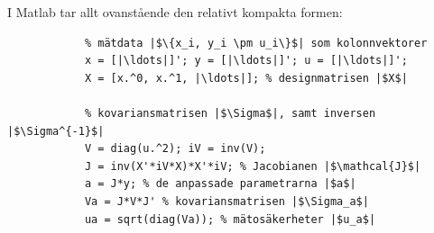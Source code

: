 \documentclass[9pt]{beamer}
\begin{document}
    \begin{frame}[fragile]
        I Matlab tar allt ovanstående den relativt kompakta formen:
        \begin{verbatim}
            % mätdata |$\{x_i, y_i \pm u_i\}$| som kolonnvektorer
            x = [|\ldots|]'; y = [|\ldots|]'; u = [|\ldots|]';
            X = [x.^0, x.^1, |\ldots|]; % designmatrisen |$X$|

            % kovariansmatrisen |$\Sigma$|, samt inversen |$\Sigma^{-1}$|
            V = diag(u.^2); iV = inv(V);
            J = inv(X'*iV*X)*X'*iV; % Jacobianen |$\mathcal{J}$|
            a = J*y; % de anpassade parametrarna |$a$|
            Va = J*V*J' % kovariansmatrisen |$\Sigma_a$|
            ua = sqrt(diag(Va)); % mätosäkerheter |$u_a$|
        \end{verbatim}
    \end{frame}

    \backupend
\end{document}

